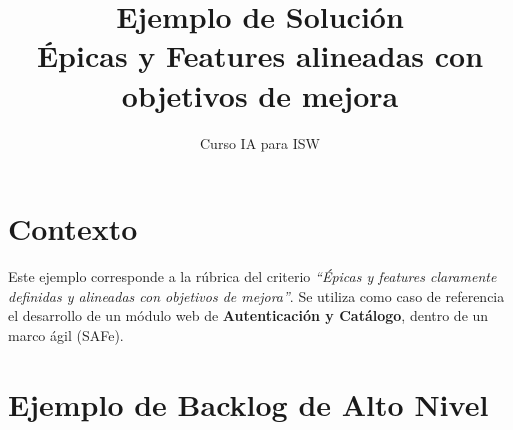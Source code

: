 \documentclass[11pt]{article}
\title{Ejemplo de Solución \\ Épicas y Features alineadas con objetivos de mejora}
\author{Curso IA para ISW}
\date{}
\begin{document}
\maketitle

\section*{Contexto}
Este ejemplo corresponde a la rúbrica del criterio \emph{``Épicas y features claramente definidas y alineadas con objetivos de mejora''}.  
Se utiliza como caso de referencia el desarrollo de un módulo web de \textbf{Autenticación y Catálogo}, dentro de un marco ágil (SAFe).

\section*{Ejemplo de Backlog de Alto Nivel}
\end{document}
